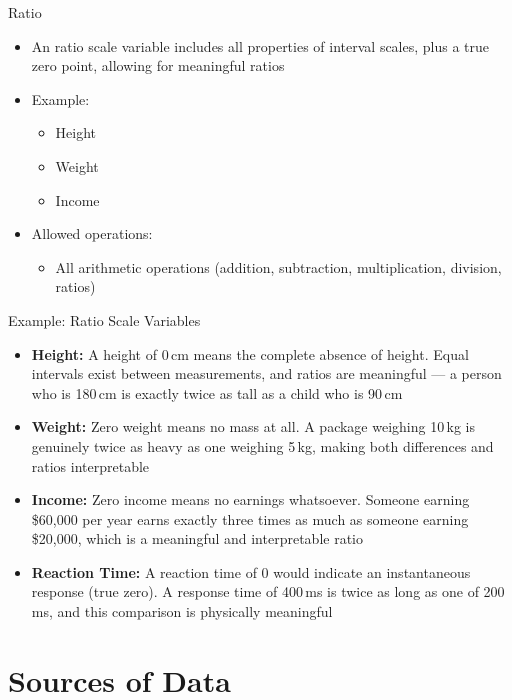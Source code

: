 \documentclass[12pt, aspectratio=169]{beamer}
\begin{document}
	\begin{frame}{Ratio}
		\begin{itemize}
			\item An ratio scale variable includes all properties of interval scales, plus a true zero point, allowing for meaningful ratios
			\item Example:
			\begin{itemize}
				\item Height
				\item Weight
				\item Income
			\end{itemize}
			\item Allowed operations:
			\begin{itemize}
				\item All arithmetic operations (addition, subtraction, multiplication, division, ratios)
			\end{itemize}
		\end{itemize}
	\end{frame}


	\begin{frame}{Example: Ratio Scale Variables}
		\begin{itemize}
			\item \textbf{Height:} A height of 0\,cm means the complete absence of height. Equal intervals exist between measurements, and ratios are meaningful --- a person who is 180\,cm is exactly twice as tall as a child who is 90\,cm
			\item \textbf{Weight:} Zero weight means no mass at all. A package weighing 10\,kg is genuinely twice as heavy as one weighing 5\,kg, making both differences and ratios interpretable
			\item \textbf{Income:} Zero income means no earnings whatsoever. Someone earning \$60{,}000 per year earns exactly three times as much as someone earning \$20{,}000, which is a meaningful and interpretable ratio
			\item \textbf{Reaction Time:} A reaction time of 0 would indicate an instantaneous response (true zero). A response time of 400\,ms is twice as long as one of 200\,ms, and this comparison is physically meaningful
		\end{itemize}
	\end{frame}


	\section{Sources of Data}
\end{document}
